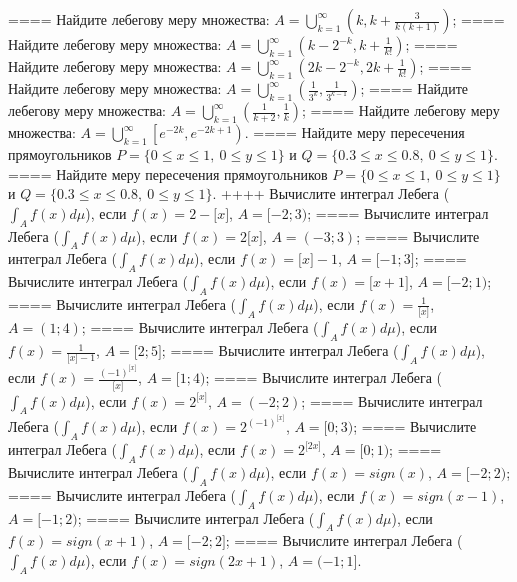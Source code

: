 ====
Найдите лебегову меру множества: \(A = \bigcup_{k = 1}^{\infty}\left( k,k + \frac{3}{k(k + 1)} \right)\);
====
Найдите лебегову меру множества: \(A = \bigcup_{k = 1}^{\infty}\left( k - 2^{- k},k + \frac{1}{k!} \right)\);
====
Найдите лебегову меру множества: \(A = \bigcup_{k = 1}^{\infty}\left( 2k - 2^{- k},2k + \frac{1}{k!} \right)\);
====
Найдите лебегову меру множества: \(A = \bigcup_{k = 1}^{\infty}\left( \frac{1}{3^{k}},\frac{1}{3^{k - 1}} \right)\);
====
Найдите лебегову меру множества: \(A = \bigcup_{k = 1}^{\infty}\left( \frac{1}{k + 2},\frac{1}{k} \right)\);
====
Найдите лебегову меру множества: \(A = \bigcup_{k = 1}^{\infty}\left\lbrack e^{- 2k},e^{- 2k + 1} \right)\).
====
Найдите меру пересечения прямоугольников \(P = \{ 0 \leq x \leq 1,\ 0 \leq y \leq 1\}\) и \(Q = \{ 0.3 \leq x \leq 0.8,\ 0 \leq y \leq 1\}\).
====
Найдите меру пересечения прямоугольников \(P = \{ 0 \leq x \leq 1,\ 0 \leq y \leq 1\}\) и \(Q = \{ 0.3 \leq x \leq 0.8,\ 0 \leq y \leq 1\}\).
++++
Вычислите интеграл Лебега (\(\int_{A}^{}{f(x)d\mu}\)), если \(f(x) = 2 - \lbrack x\rbrack\), \(A = \lbrack - 2;3)\);
====
Вычислите интеграл Лебега (\(\int_{A}^{}{f(x)d\mu}\)), если \(f(x) = 2\lbrack x\rbrack\), \(A = ( - 3;3)\);
====
Вычислите интеграл Лебега (\(\int_{A}^{}{f(x)d\mu}\)), если \(f(x) = \lbrack x\rbrack - 1\), \(A = \lbrack - 1;3\rbrack\);
====
Вычислите интеграл Лебега (\(\int_{A}^{}{f(x)d\mu}\)), если \(f(x) = \lbrack x + 1\rbrack\), \(A = \lbrack - 2;1)\);
====
Вычислите интеграл Лебега (\(\int_{A}^{}{f(x)d\mu}\)), если \(f(x) = \frac{1}{\lbrack x\rbrack}\), \(A = (1;4)\);
====
Вычислите интеграл Лебега (\(\int_{A}^{}{f(x)d\mu}\)), если \(f(x) = \frac{1}{\lbrack x\rbrack - 1}\), \(A = \lbrack 2;5\rbrack\);
====
Вычислите интеграл Лебега (\(\int_{A}^{}{f(x)d\mu}\)), если \(f(x) = \frac{( - 1)^{\lbrack x\rbrack}}{\lbrack x\rbrack}\), \(A = \lbrack 1;4)\);
====
Вычислите интеграл Лебега (\(\int_{A}^{}{f(x)d\mu}\)), если \(f(x) = 2^{\lbrack x\rbrack}\), \(A = ( - 2;2)\);
====
Вычислите интеграл Лебега (\(\int_{A}^{}{f(x)d\mu}\)), если \(f(x) = 2^{( - 1)^{\lbrack x\rbrack}}\), \(A = \lbrack 0;3)\);
====
Вычислите интеграл Лебега (\(\int_{A}^{}{f(x)d\mu}\)), если \(f(x) = 2^{\lbrack 2x\rbrack}\), \(A = \lbrack 0;1)\);
====
Вычислите интеграл Лебега (\(\int_{A}^{}{f(x)d\mu}\)), если \(f(x) = sign(x)\), \(A = \lbrack - 2;2)\);
====
Вычислите интеграл Лебега (\(\int_{A}^{}{f(x)d\mu}\)), если \(f(x) = sign(x - 1)\), \(A = \lbrack - 1;2)\);
====
Вычислите интеграл Лебега (\(\int_{A}^{}{f(x)d\mu}\)), если \(f(x) = sign(x + 1)\), \(A = \lbrack - 2;2\rbrack\);
====
Вычислите интеграл Лебега (\(\int_{A}^{}{f(x)d\mu}\)), если \(f(x) = sign(2x + 1)\), \(A = ( - 1;1\rbrack\).
